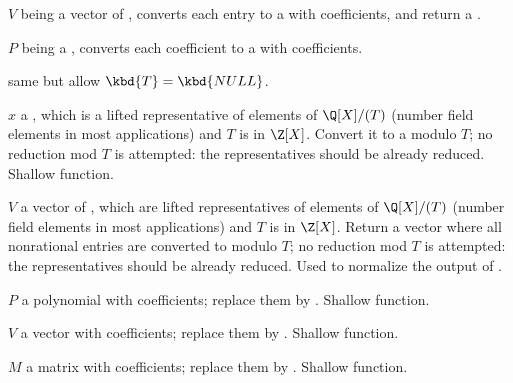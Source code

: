






 $V$ being a vector of ,
converts each entry to a  with  coefficients, and return
a .

$P$ being a , converts each coefficient to a  with
 coefficients.

 same but allow
$\kbd{T} = \kbd{NULL}$.



 $x$ a , which is
a lifted representative of elements of $\Q[X]/(T)$ (number field elements
in most applications) and $T$ is in $\Z[X]$. Convert it to a 
modulo $T$; no reduction mod $T$ is attempted: the representatives should be
already reduced. Shallow function.

 $V$ a vector of , which
are lifted representatives of elements of $\Q[X]/(T)$ (number field elements
in most applications) and $T$ is in $\Z[X]$. Return a vector where all
nonrational entries are converted to  modulo $T$; no reduction
mod $T$ is attempted: the representatives should be already reduced. Used to
normalize the output of .

 $P$ a polynomial with 
coefficients; replace them by . Shallow function.

 $V$ a vector with 
coefficients; replace them by . Shallow function.

 $M$ a matrix with 
coefficients; replace them by . Shallow function.

